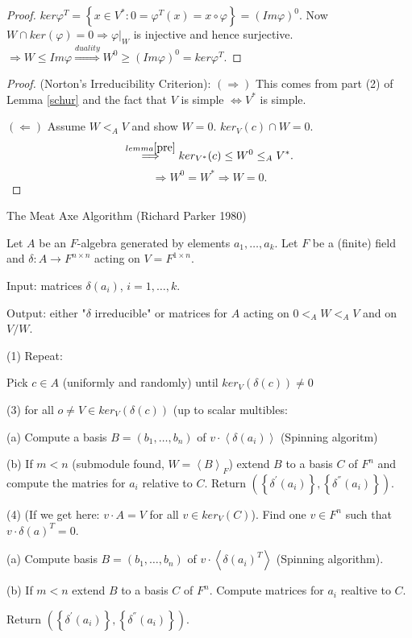 \documentclass[12pt]{amsart}
\theoremstyle{definition}
\begin{document}
\begin{proof}
$ker \varphi^{T} = \left\{ x \in V^{\ast} : 0 = \varphi^{T} (x) = x \circ \varphi \right\} = (Im \varphi)^{0}$. Now $W \cap ker( \varphi ) = 0 \Rightarrow \varphi |_{W} $ is injective and hence surjective. $\Rightarrow W \leq Im \varphi \stackrel{duality}{\Longrightarrow} W^{0} \geq (Im \varphi)^{0} = ker \varphi^{T}$.
\end{proof}

\begin{proof} (Norton's Irreducibility Criterion):
$\left( \Rightarrow \right)$ This comes from part (2) of Lemma \ref{schur} and the fact that $V$ is simple $\Leftrightarrow V^{\ast}$ is simple.

$\left( \Leftarrow \right)$ Assume $W <_{A} V$ and show $W = 0$.
$ker_{V} (c) \cap W = 0$. $$\stackrel{lemma \ref{pre}}{\Longrightarrow} ker_{V^{\ast}} (c) \leq W^{0} \leq_{A} V^{\ast}.$$
$$\Rightarrow W^{0} = W^{\ast} \Rightarrow W = 0.$$
\end{proof}

\begin{center}
The Meat Axe Algorithm (Richard Parker 1980)
\end{center}
Let $A$ be an $F$-algebra generated by elements $a_{1}, \ldots, a_{k}$. Let $F$ be a (finite) field and $\delta: A \rightarrow F^{n \times n}$ acting on $V = F^{1 \times n}$.

Input: matrices $\delta (a_{i})$, $i = 1, \ldots, k$.

Output: either "$\delta$ irreducible" or matrices for $A$ acting on $0 <_{A} W <_{A} V$ and on $V/W$.

(1) Repeat:

Pick $c \in A$ (uniformly and randomly) until $ker_{V} (\delta (c)) \neq 0$

(3) for all $o \neq V \in ker_{V} (\delta(c))$ (up to scalar multibles:

(a) Compute a  basis $B = (b_{1}, \ldots, b_{n} )$ of $v \cdot \left\langle \delta (a_{i}) \right\rangle$ (Spinning algoritm)

(b) If $m < n$ (submodule found, $W = \left\langle B \right\rangle_{F}$) extend $B$ to a basis $C$ of $F^{n}$ and compute the matries for $a_{i}$  relative to $C$. Return $\left( \left\{ \delta^{'} (a_{i}) \right\}, \left\{ \delta^{''}(a_{i}) \right\} \right)$.

(4) (If we get here: $v\cdot A =V$ for all $v \in ker_{V} (C)$). Find one $v \in F^{n}$ such that $v \cdot \delta (a)^{T} = 0$.

(a) Compute basis $B = ( b_{1}, \ldots, b_{n})$ of $v \cdot \left\langle \delta (a_{i})^{T} \right\rangle$ (Spinning algorithm).

(b)  If $m < n$ extend $B$ to a basis $C$ of $F^{n}$. Compute matrices for $a_{i}$ realtive to $C$. 

Return $\left( \left\{ \delta^{'} (a_{i}) \right\}, \left\{ \delta^{''} (a_{i} ) \right\} \right)$.


\nocite{*}




\end{document}
